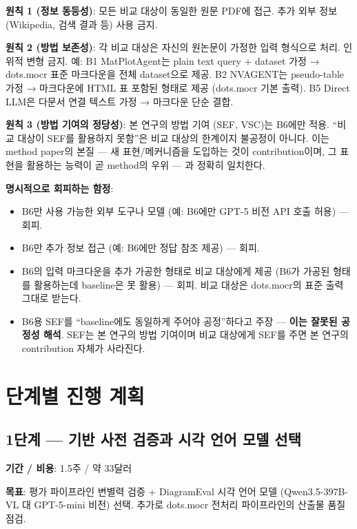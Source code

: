 \documentclass[11pt]{article}
\begin{document}
\textbf{원칙 1 (정보 동등성)}: 모든 비교 대상이 동일한 원문 PDF에 접근. 추가 외부 정보 (Wikipedia, 검색 결과 등) 사용 금지.

\textbf{원칙 2 (방법 보존성)}: 각 비교 대상은 자신의 원논문이 가정한 입력 형식으로 처리. 인위적 변형 금지. 예: B1 MatPlotAgent는 plain text query + dataset 가정 → dots.mocr 표준 마크다운을 전체 dataset으로 제공. B2 NVAGENT는 pseudo-table 가정 → 마크다운에 HTML 표 포함된 형태로 제공 (dots.mocr 기본 출력). B5 Direct LLM은 다문서 연결 텍스트 가정 → 마크다운 단순 결합.

\textbf{원칙 3 (방법 기여의 정당성)}: 본 연구의 방법 기여 (SEF, VSC)는 B6에만 적용. ``비교 대상이 SEF를 활용하지 못함''은 비교 대상의 한계이지 불공정이 아니다. 이는 method paper의 본질 — 새 표현/메커니즘을 도입하는 것이 contribution이며, 그 표현을 활용하는 능력이 곧 method의 우위 — 과 정확히 일치한다.

\textbf{명시적으로 회피하는 함정}:
\begin{itemize}[leftmargin=*]
    \item B6만 사용 가능한 외부 도구나 모델 (예: B6에만 GPT-5 비전 API 호출 허용) — 회피.
    \item B6만 추가 정보 접근 (예: B6에만 정답 참조 제공) — 회피.
    \item B6의 입력 마크다운을 추가 가공한 형태로 비교 대상에게 제공 (B6가 가공된 형태를 활용하는데 baseline은 못 활용) — 회피. 비교 대상은 dots.mocr의 표준 출력 그대로 받는다.
    \item B6용 SEF를 ``baseline에도 동일하게 주어야 공정''하다고 주장 — \textbf{이는 잘못된 공정성 해석}. SEF는 본 연구의 방법 기여이며 비교 대상에게 SEF를 주면 본 연구의 contribution 자체가 사라진다.
\end{itemize}

\section{단계별 진행 계획}

\subsection{1단계 — 기반 사전 검증과 시각 언어 모델 선택}

\textbf{기간 / 비용}: 1.5주 / 약 33달러

\textbf{목표}: 평가 파이프라인 변별력 검증 + DiagramEval 시각 언어 모델 (Qwen3.5-397B-VL 대 GPT-5-mini 비전) 선택. 추가로 dots.mocr 전처리 파이프라인의 산출물 품질 점검.
\end{document}

